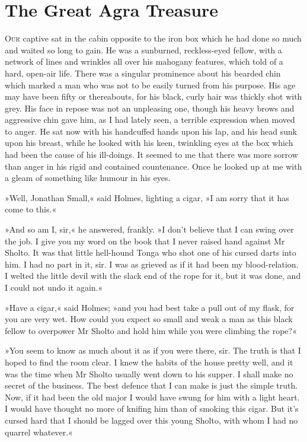 \chapter{The Great Agra Treasure}
\lettrine[lines=4]{O}{ur} captive sat in the cabin opposite to the iron box which he had done so much and waited so long to gain. He was a sunburned, reckless-eyed fellow, with a network of lines and wrinkles all over his mahogany features, which told of a hard, open-air life. There was a singular prominence about his bearded chin which marked a man who was not to be easily turned from his purpose. His age may have been fifty or thereabouts, for his black, curly hair was thickly shot with grey. His face in repose was not an unpleasing one, though his heavy brows and aggressive chin gave him, as I had lately seen, a terrible expression when moved to anger. He sat now with his handcuffed hands upon his lap, and his head sunk upon his breast, while he looked with his keen, twinkling eyes at the box which had been the cause of his ill-doings. It seemed to me that there was more sorrow than anger in his rigid and contained countenance. Once he looked up at me with a gleam of something like humour in his eyes.

»Well, Jonathan Small,« said Holmes, lighting a cigar, »I am sorry that it has come to this.«

»And so am I, sir,« he answered, frankly. »I don't believe that I can swing over the job. I give you my word on the book that I never raised hand against Mr Sholto. It was that little hell-hound Tonga who shot one of his cursed darts into him. I had no part in it, sir. I was as grieved as if it had been my blood-relation. I welted the little devil with the slack end of the rope for it, but it was done, and I could not undo it again.«

»Have a cigar,« said Holmes; »and you had best take a pull out of my flask, for you are very wet. How could you expect so small and weak a man as this black fellow to overpower Mr Sholto and hold him while you were climbing the rope?«

»You seem to know as much about it as if you were there, sir. The truth is that I hoped to find the room clear. I knew the habits of the house pretty well, and it was the time when Mr Sholto usually went down to his supper. I shall make no secret of the business. The best defence that I can make is just the simple truth. Now, if it had been the old major I would have swung for him with a light heart. I would have thought no more of knifing him than of smoking this cigar. But it's cursed hard that I should be lagged over this young Sholto, with whom I had no quarrel whatever.«

